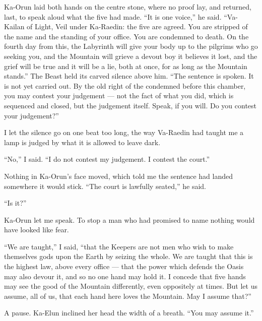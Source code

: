 Ka-Orun laid both hands on the centre stone, where no proof lay, and returned, last, to speak aloud what the five had made. ``It is one voice,'' he said. ``Va-Kailan of Light, Veil under Ka-Raedin: the five are agreed. You are stripped of the name and the standing of your office. You are condemned to death. On the fourth day from this, the Labyrinth will give your body up to the pilgrims who go seeking you, and the Mountain will grieve a devout boy it believes it lost, and the grief will be true and it will be a lie, both at once, for as long as the Mountain stands.'' The Beast held its carved silence above him. ``The sentence is spoken. It is not yet carried out. By the old right of the condemned before this chamber, you may contest your judgement --- not the fact of what you did, which is sequenced and closed, but the judgement itself. Speak, if you will. Do you contest your judgement?''\par
 
\ornament
 
I let the silence go on one beat too long, the way Va-Raedin had taught me a lamp is judged by what it is allowed to leave dark.\par
 
``No,'' I said. ``I do not contest my judgement. I contest the court.''\par
 
Nothing in Ka-Orun's face moved, which told me the sentence had landed somewhere it would stick. ``The court is lawfully seated,'' he said.\par
 
``Is it?'' 
 
Ka-Orun let me speak. To stop a man who had promised to name nothing would have looked like fear.\par
 
``We are taught,'' I said, ``that the Keepers are not men who wish to make themselves gods upon the Earth by seizing the whole. We are taught that this is the highest law, above every office --- that the power which defends the Oasis may also devour it, and so no one hand may hold it. I concede that five hands may see the good of the Mountain differently, even oppositely at times. But let us assume, all of us, that each hand here loves the Mountain. May I assume that?''\par
 
A pause. Ka-Elun inclined her head the width of a breath. ``You may assume it.''\par
 
